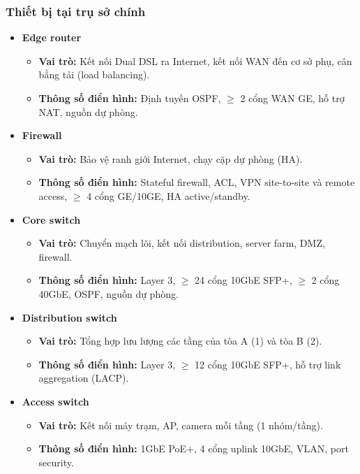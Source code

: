 \subsubsection{Thiết bị tại trụ sở chính}
\begin{itemize}
    \item \textbf{Edge router}
    \begin{itemize}
        \item \textbf{Vai trò:} Kết nối Dual DSL ra Internet, kết nối WAN đến cơ sở phụ, cân bằng tải (load balancing).
        \item \textbf{Thông số điển hình:} Định tuyến OSPF, $\geq$ 2 cổng WAN GE, hỗ trợ NAT, nguồn dự phòng.
    \end{itemize}

    \item \textbf{Firewall}
    \begin{itemize}
        \item \textbf{Vai trò:} Bảo vệ ranh giới Internet, chạy cặp dự phòng (HA).
        \item \textbf{Thông số điển hình:} Stateful firewall, ACL, VPN site-to-site và remote access, $\geq$ 4 cổng GE/10GE, HA active/standby.
    \end{itemize}

    \item \textbf{Core switch}
    \begin{itemize}
        \item \textbf{Vai trò:} Chuyển mạch lõi, kết nối distribution, server farm, DMZ, firewall.
        \item \textbf{Thông số điển hình:} Layer 3, $\geq$ 24 cổng 10GbE SFP+, $\geq$ 2 cổng 40GbE, OSPF, nguồn dự phòng.
    \end{itemize}

    \item \textbf{Distribution switch}
    \begin{itemize}
        \item \textbf{Vai trò:} Tổng hợp lưu lượng các tầng của tòa A (1) và tòa B (2).
        \item \textbf{Thông số điển hình:} Layer 3, $\geq$ 12 cổng 10GbE SFP+, hỗ trợ link aggregation (LACP).
    \end{itemize}

    \item \textbf{Access switch}
    \begin{itemize}
        \item \textbf{Vai trò:} Kết nối máy trạm, AP, camera mỗi tầng (1 nhóm/tầng).
        \item \textbf{Thông số điển hình:} 1GbE PoE+, 4 cổng uplink 10GbE, VLAN, port security.
    \end{itemize}


\end{itemize}
